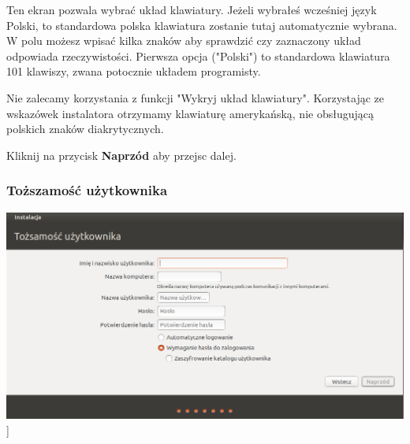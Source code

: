 Ten ekran pozwala wybrać układ klawiatury. Jeżeli wybrałeś wcześniej język Polski, to standardowa polska klawiatura zostanie tutaj automatycznie wybrana. W polu możesz wpisać kilka znaków aby sprawdzić czy zaznaczony układ odpowiada rzeczywistości. Pierwsza opcja ("Polski") to standardowa klawiatura 101 klawiszy, zwana potocznie układem programisty.

Nie zalecamy korzystania z funkcji "Wykryj układ klawiatury". Korzystając ze wskazówek instalatora otrzymamy klawiaturę amerykańską, nie obsługującą polskich znaków diakrytycznych.

\begin{flushright}
Kliknij na przycisk \textbf{Naprzód} aby przejsc dalej.
\end{flushright}
\clearpage

\subsubsection{Toższamość użytkownika}
\begin{center}
	\includegraphics[scale=0.5]{images/instalator_dane.png}]
\end{center}

